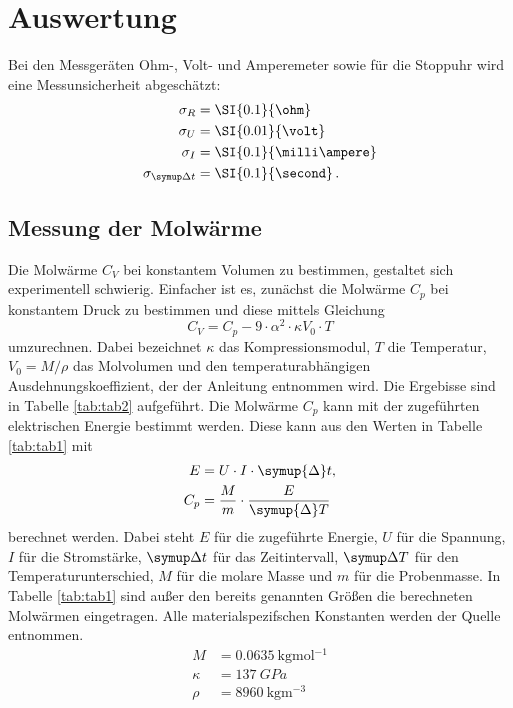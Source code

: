 \section{Auswertung}
\label{sec:Auswertung}

Bei den Messgeräten Ohm-, Volt- und Amperemeter sowie für die Stoppuhr wird eine Messunsicherheit abgeschätzt:
\begin{align*}
	\sigma_R &= \SI{0.1}{\ohm}\\
	\sigma_U &= \SI{0.01}{\volt}\\
	\sigma_I &= \SI{0.1}{\milli\ampere}\\
	\sigma_{\symup\Delta t} &= \SI{0.1}{\second}	\,\text.
\end{align*}

\subsection{Messung der Molwärme}
Die Molwärme $C_V$ bei konstantem Volumen zu bestimmen, gestaltet sich experimentell schwierig. Einfacher ist es, zunächst die Molwärme $C_p$ bei konstantem Druck zu bestimmen und diese mittels Gleichung
\begin{equation}
  C_V = C_p - 9 \cdot \alpha^2 \cdot \kappa V_0 \cdot T
\end{equation}
umzurechnen.
Dabei bezeichnet $\kappa$ das Kompressionsmodul, $T$ die Temperatur, $V_0 = M/\rho$ das Molvolumen und \alpha den temperaturabhängigen Ausdehnungskoeffizient, der der Anleitung \cite{V47} entnommen wird.
Die Ergebisse sind in Tabelle \ref{tab:tab2} aufgeführt.
Die Molwärme $C_p$ kann mit der zugeführten elektrischen Energie bestimmt werden.
Diese kann aus den Werten in Tabelle \ref{tab:tab1} mit
\begin{align}
	E &= U \cdot I \cdot \symup{\Delta} t,\\
	C_p &= \frac{M}{m}\cdot\frac{E}{\symup{\Delta} T}
	\label{eqn:cp}
\end{align}
berechnet werden.
Dabei steht $E$ für die zugeführte Energie, $U$ für die Spannung, $I$ für die Stromstärke, $\symup\Delta t$ für das Zeitintervall, $\symup\Delta T$ für den Temperaturunterschied, $M$ für die molare Masse und $m$ für die Probenmasse.
In Tabelle \ref{tab:tab1} sind außer den bereits genannten Größen die berechneten Molwärmen eingetragen.
Alle materialspezifschen Konstanten werden der Quelle \cite{kupfer} entnommen.
\begin{align*}
  M &= \SI{0.0635}{\kilo\gram\mol^{-1}} \\
  \kappa &= \SI{137}{GPa} \\
  \rho &= \SI{8960}{\kilo\gram\meter^{-3}}
\end{align*}
